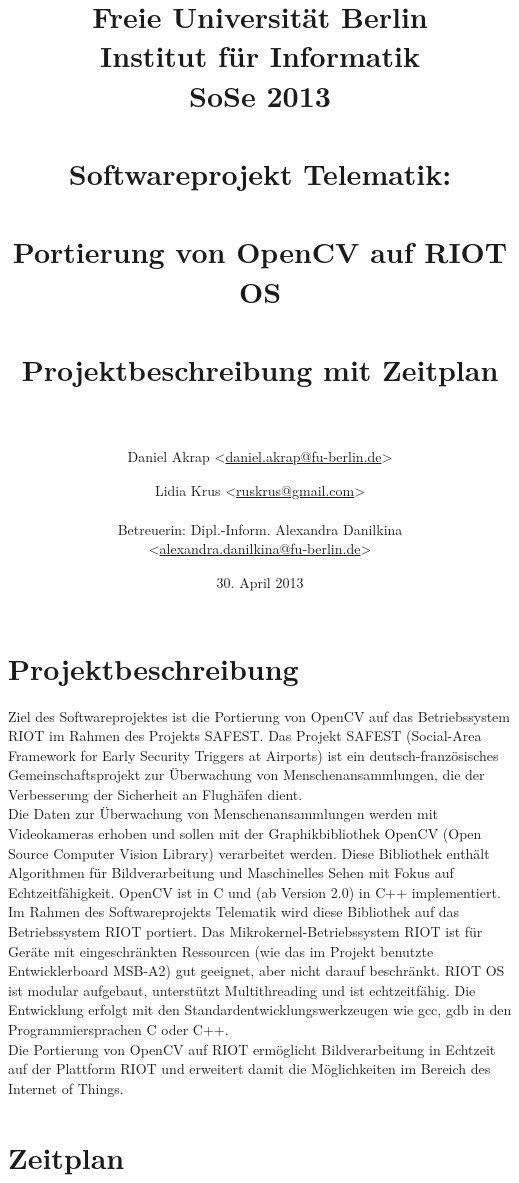 \documentclass[10pt,a4paper]{article}
\title{Freie Universität Berlin \\
	Institut für Informatik \\
	SoSe 2013 \\ \ \\
	Softwareprojekt Telematik: \\ \ \\
	\textbf {Portierung von OpenCV auf RIOT OS} \\ \ \\
	Projektbeschreibung mit Zeitplan \\ \ \\}
\author{Daniel Akrap  \textless\href{mailto:daniel.akrap@fu-berlin.de}{daniel.akrap@fu-berlin.de}\textgreater
        \and Lidia Krus \textless\href{mailto:ruskrus@gmail.com}{ruskrus@gmail.com}\textgreater 		\\ \\
	Betreuerin: Dipl.-Inform. Alexandra Danilkina \\ 
	\textless\href{mailto:alexandra.danilkina@fu-berlin.de}{alexandra.danilkina@fu-berlin.de}\textgreater}
\date{30. April 2013}
\begin{document}
\maketitle

\newpage
\section{Projektbeschreibung}

Ziel des Softwareprojektes ist die Portierung von OpenCV auf das Betriebssystem RIOT im Rahmen des Projekts SAFEST.
Das Projekt SAFEST (Social-Area Framework for Early Security Triggers at Airports) ist ein deutsch-französisches Gemeinschaftsprojekt zur Überwachung von Menschenansammlungen, die der Verbesserung der Sicherheit an Flughäfen dient. \\

Die Daten zur Überwachung von Menschenansammlungen werden mit Videokameras erhoben und sollen mit der Graphikbibliothek OpenCV (Open Source Computer Vision Library) verarbeitet werden. Diese Bibliothek enthält Algorithmen für Bildverarbeitung und Maschinelles Sehen mit Fokus auf Echtzeitfähigkeit. OpenCV ist in C und (ab Version 2.0) in C++ implementiert. \\

Im Rahmen des Softwareprojekts Telematik wird diese Bibliothek auf das Betriebssystem RIOT portiert. Das Mikrokernel-Betriebssystem RIOT ist für Geräte mit eingeschränkten Ressourcen (wie das im Projekt benutzte Entwicklerboard MSB-A2) gut geeignet, aber nicht darauf beschränkt. RIOT OS ist modular aufgebaut, unterstützt Multithreading und ist echtzeitfähig. Die Entwicklung erfolgt mit den Standardentwicklungswerkzeugen wie gcc, gdb in den Programmiersprachen C oder C++. \\

Die Portierung von OpenCV auf RIOT ermöglicht Bildverarbeitung in Echtzeit auf der Plattform RIOT und erweitert damit die Möglichkeiten im Bereich des Internet of Things. \\

\newpage
\section{Zeitplan}
\end{document}
